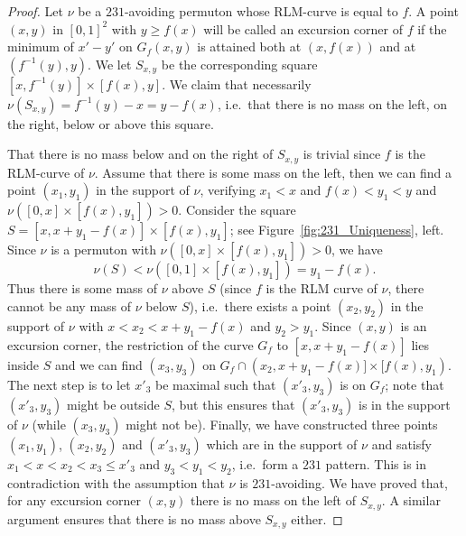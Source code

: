 \documentclass[a4paper,11pt]{amsart}
\theoremstyle{definition}
\begin{document}
\begin{proof}
    Let $\nu$ be a $231$-avoiding permuton whose RLM-curve is equal to $f$.
    A point $(x,y)$ in $[0,1]^2$ with $y \ge f(x)$ will be called an excursion corner of $f$ if the minimum of $x'-y'$ on $G_f(x,y)$ is attained both at $(x,f(x))$ and at $(f^{-1}(y),y)$.
    We let $S_{x,y}$ be the corresponding square $[x,f^{-1}(y)] \times [f(x),y]$.
    We claim that necessarily $\nu(S_{x,y})=f^{-1}(y)-x=y-f(x)$, i.e.~that there is no mass on the left, on the right, below or above this square.
    
    That there is no mass below and on the right of $S_{x,y}$ is trivial since $f$ is the RLM-curve of $\nu$.
    Assume that there is some mass on the left, then we can find a point $(x_1,y_1)$ in the support of $\nu$, verifying $x_1<x$ and $f(x)<y_1<y$ and $\nu([0,x] \times [f(x),y_1])>0$.
    Consider the square $S=[x,x+y_1-f(x)] \times [f(x),y_1]$; see Figure~\ref{fig:231_Uniqueness}, left. Since $\nu$ is a permuton with $\nu([0,x] \times [f(x),y_1])>0$, we have
    \[ \nu(S) < \nu( [0,1] \times [f(x),y_1] ) =y_1-f(x).\]
    Thus there is some mass of $\nu$ above $S$ (since $f$ is the RLM curve of $\nu$, there cannot be any mass of $\nu$ below $S$),
    i.e.~there exists a point $(x_2,y_2)$ in the support of $\nu$ with $x<x_2<x+y_1-f(x)$ and $y_2>y_1$.
    Since $(x,y)$ is an excursion corner, the restriction of the curve $G_f$ to $[x,x+y_1-f(x)]$ lies inside $S$ and we can find $(x_3,y_3)$ on 
    $G_f \cap (x_2, x+y_1-f(x)] \times [f(x), y_1)$.
    The next step is to let $x'_3$ be maximal such that $(x'_3,y_3)$ is on $G_f$;
    note that $(x'_3,y_3)$ might be outside $S$, but this ensures that $(x'_3,y_3)$ is in the support of $\nu$ (while $(x_3,y_3)$ might not be).
    Finally, we have constructed three points $(x_1,y_1)$, $(x_2,y_2)$ and $(x'_3,y_3)$ which are in the support of $\nu$ and satisfy $x_1<x<x_2<x_3 \le x'_3$ and $y_3<y_1<y_2$, i.e.~form a $231$ pattern.
    This is in contradiction with the assumption that $\nu$ is $231$-avoiding.
    We have proved that, for any excursion corner $(x,y)$ there is no mass on the left of $S_{x,y}$.
    A similar argument ensures that there is no mass above $S_{x,y}$ either.
    

\end{proof}
\end{document}
